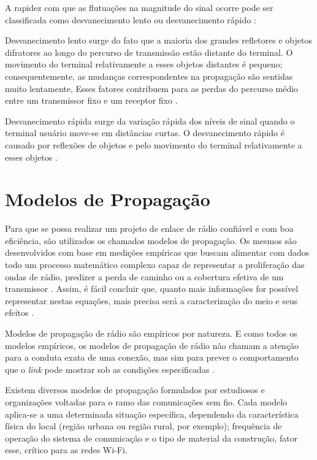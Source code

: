 A rapidez com que as flutuações na magnitude do sinal ocorre pode ser classificada como desvanecimento lento ou desvanecimento rápido \cite{haykin2008}:

\begin{citacao}
	Desvanecimento lento surge do fato que a maioria dos grandes refletores e objetos difratores ao longo do percurso de transmissão estão distante do terminal. O movimento do terminal relativamente a esses objetos distantes é pequeno; consequentemente, as mudanças correspondentes na propagação são sentidas muito lentamente, Esses fatores contribuem para as perdas do percurso médio entre um transmissor fixo e um receptor fixo \cite{haykin2008}.
	
	Desvanecimento rápida surge da variação rápida dos níveis de sinal quando o terminal usuário move-se em distâncias curtas. O desvanecimento rápido é causado por reflexões de objetos e pelo movimento do terminal relativamente a esses objetos \cite{haykin2008}.
\end{citacao}

\section{Modelos de Propagação}
\label{sec:modelos-propagacao}

Para que se possa realizar um projeto de enlace de rádio confiável e com boa eficiência, são utilizados os chamados modelos de propagação. Os mesmos são desenvolvidos com base em medições empíricas que buscam alimentar com dados todo um processo matemático complexo capaz de representar a proliferação das ondas de rádio, predizer a perda de caminho ou a cobertura efetiva de um transmissor \cite{akpaida2018,najnudel2004}. Assim, é fácil concluir que, quanto mais informações for possível representar nestas equações, mais precisa será a caracterização do meio e seus efeitos \cite{akpaida2018}.

Modelos de propagação de rádio são empíricos por natureza. E como todos os modelos empíricos, os modelos de propagação de rádio não chamam a atenção para a conduta exata de uma conexão, mas sim para prever o comportamento que o \textit{link} pode mostrar sob as condições especificadas \cite{akpaida2018}.

Existem diversos modelos de propagação formulados por estudiosos e organizações voltadas para o ramo das comunicações sem fio. Cada modelo aplica-se a uma determinada situação específica, dependendo da característica física do local (região urbana ou região rural, por exemplo); frequência de operação do sistema de comunicação e o tipo de material da construção, fator esse, crítico para as redes Wi-Fi.

